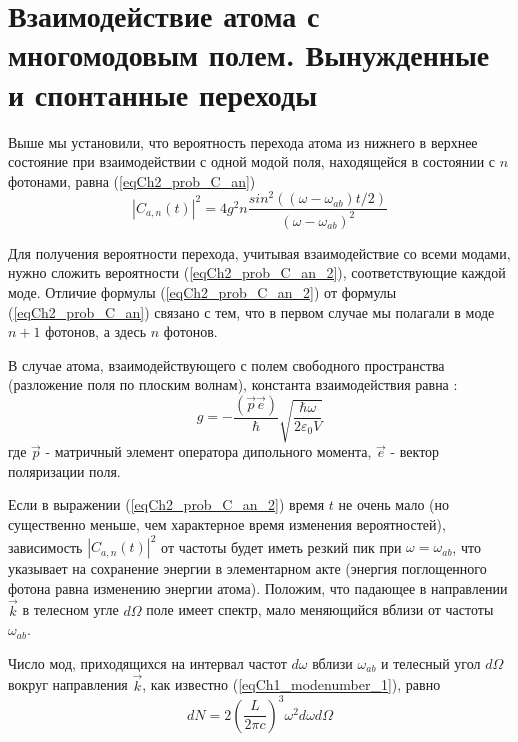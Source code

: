 \section{Взаимодействие атома с многомодовым полем. Вынужденные и
  спонтанные переходы}
Выше мы установили, что вероятность перехода атома из нижнего в
верхнее состояние при взаимодействии с одной модой поля, находящейся в
состоянии с $n$ фотонами, равна (\ref{eqCh2_prob_C_an}) 
\begin{equation}
\left|C_{a,n}\left(t\right)\right|^2 = 4 g^2 n
  \frac{sin^2\left(\left(\omega - 
  \omega_{ab}\right)t/2\right)} {\left(\omega - 
  \omega_{ab}\right)^2}
\label{eqCh2_prob_C_an_2}
\end{equation}

Для получения вероятности перехода, учитывая взаимодействие со всеми
модами, нужно сложить вероятности (\ref{eqCh2_prob_C_an_2}),
соответствующие каждой моде. Отличие формулы (\ref{eqCh2_prob_C_an_2})
от формулы (\ref{eqCh2_prob_C_an}) связано с тем, что в первом 
случае мы полагали в моде $n + 1$  фотонов, а здесь  $n$  фотонов.   

В случае атома, взаимодействующего с полем свободного пространства
(разложение поля по плоским волнам), константа взаимодействия равна
\cite{bLuisell1972}: 
\begin{equation}
g = - \frac{\left(\vec{p}\vec{e}\right)}{\hbar}
\sqrt{\frac{\hbar \omega}{2 \varepsilon_0 V}}
\end{equation}
где $\vec{p}$ - матричный элемент оператора дипольного момента,
$\vec{e}$ - вектор поляризации поля. 

Если в выражении (\ref{eqCh2_prob_C_an_2}) время $t$ не очень мало (но
существенно меньше, чем характерное время изменения вероятностей),
зависимость $\left|C_{a,n}\left(t\right)\right|^2$ от частоты будет
иметь резкий пик при $\omega = \omega_{ab}$,  что указывает на
сохранение энергии в элементарном акте (энергия поглощенного фотона
равна изменению энергии атома). Положим, что падающее в направлении
$\vec{k}$ в телесном угле $d \Omega$ поле имеет спектр, мало
меняющийся вблизи от частоты $\omega_{ab}$. 
 
Число мод, приходящихся на интервал частот $d \omega$  вблизи
$\omega_{ab}$ и телесный угол $d \Omega$  вокруг направления
$\vec{k}$,  как известно (\ref{eqCh1_modenumber_1}), равно
\begin{equation}
d N = 2 \left(\frac{L}{2 \pi c} \right)^3 \omega^2 d \omega d \Omega
\end{equation}

